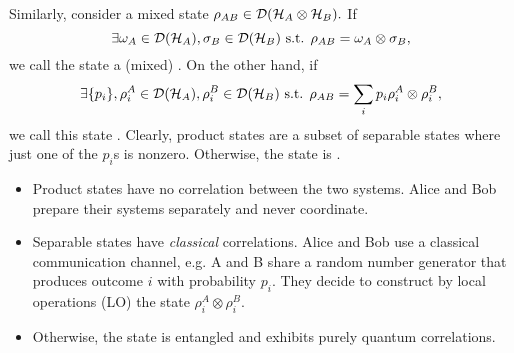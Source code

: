 Similarly, consider a mixed state $\rho_{AB}\in \mathcal{D}(\mathcal H_A \otimes \mathcal H_B).$ If
\begin{equation}
    \exists \omega_A\in \mathcal{D}(\mathcal H_A), \sigma_B \in \mathcal{D}(\mathcal H_B)\text{ s.t. }\rho_{AB} =\omega_A \otimes \sigma_B,
\end{equation}
we call the state a (mixed) . On the other hand, if
\begin{equation}
    \exists \{p_i\}, \rho_i^A \in \mathcal{D}(\mathcal H_A), \rho_i^B \in \mathcal{D}(\mathcal H_B) \text{ s.t. } \rho_{AB}=\sum_i p_i \rho_i^A \otimes \rho_i^B,
\end{equation}
we call this state . Clearly, product states are a subset of separable states where just one of the $p_i$s is nonzero. Otherwise, the state is .
\begin{itemize}
    \item Product states have no correlation between the two systems. Alice and Bob prepare their systems separately and never coordinate.
    \item Separable states have \emph{classical} correlations. Alice and Bob use a classical communication channel, e.g. A and B share a random number generator that produces outcome $i$ with probability $p_i$. They decide to construct by local operations (LO) the state $\rho_i^A \otimes \rho_i^B$.
    \item Otherwise, the state is entangled and exhibits purely quantum correlations.
\end{itemize}